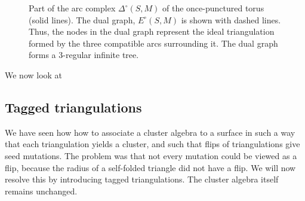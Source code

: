 \begin{example}
\begin{figure}[ht!]

		\caption{Part of the arc complex $\Delta^\circ(S, M)$ of the once-punctured torus (solid lines). The dual graph, $E^\circ(S,M)$ is shown with dashed lines. Thus, the nodes in the dual graph represent the ideal triangulation formed by the three compatible arcs surrounding it. The dual graph forms a 3-regular infinite tree. }
		\label{fig:torus_arc_complex}
	\end{figure}
\end{example}

\begin{example}

	We now look at
\end{example}

\subsection{Tagged triangulations}\label{sec:tagged_triangulations}

We have seen how how to associate a cluster algebra to a surface in such a way that
each triangulation yields a cluster, and such that flips of triangulations give seed
mutations. The problem was that not every mutation could be viewed as a flip, because
the radius of a self-folded triangle did not have a flip. We will now resolve this by
introducing tagged triangulations. The cluster algebra itself remains unchanged.


